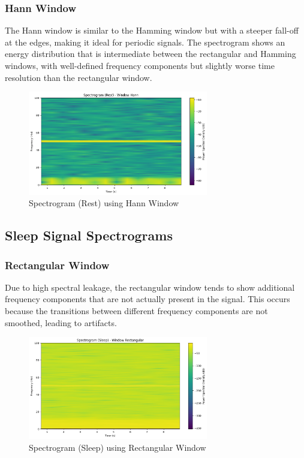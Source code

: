 \documentclass[10pt]{article}
\theoremstyle{definition}
\theoremstyle{remark}
\theoremstyle{definition}
\numberwithin{equation}{prob}
\begin{document}
\subsubsection{Hann Window}
The Hann window is similar to the Hamming window but with a steeper fall-off at the edges, making it ideal for periodic signals. The spectrogram shows an energy distribution that is intermediate between the rectangular and Hamming windows, with well-defined frequency components but slightly worse time resolution than the rectangular window.

\begin{figure}[H]
    \centering
    \includegraphics[width=0.7\textwidth]{./figures/Spectrogram (Rest) - Window Hann.png}
    \caption{Spectrogram (Rest) using Hann Window}
\end{figure}


\subsection{Sleep Signal Spectrograms}

\subsubsection{Rectangular Window}
Due to high spectral leakage, the rectangular window tends to show additional frequency components that are not actually present in the signal. This occurs because the transitions between different frequency components are not smoothed, leading to artifacts.

\begin{figure}[H]
    \centering
    \includegraphics[width=0.7\textwidth]{./figures/Spectrogram (Sleep) - Window Rectangular.png}
    \caption{Spectrogram (Sleep) using Rectangular Window}
\end{figure}
\end{document}
